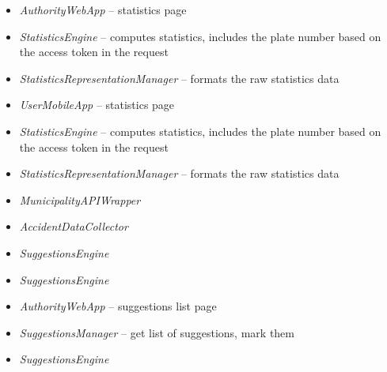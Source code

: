 \begin{description}
    \begin{itemize}
        \item \emph{AuthorityWebApp} -- statistics page
        \item \emph{StatisticsEngine} -- computes statistics, includes the plate
        number based on the access token in the request
        \item \emph{StatisticsRepresentationManager} -- formats the raw
        statistics data
    \end{itemize}

    \begin{itemize}
        \item \emph{UserMobileApp} -- statistics page
        \item \emph{StatisticsEngine} -- computes statistics, includes the plate
        number based on the access token in the request
        \item \emph{StatisticsRepresentationManager} -- formats the raw
        statistics data
    \end{itemize}

    \begin{itemize}
        \item \emph{MunicipalityAPIWrapper}
        \item \emph{AccidentDataCollector}
    \end{itemize}

    \begin{itemize}
        \item \emph{SuggestionsEngine}
    \end{itemize}

    \begin{itemize}
        \item \emph{SuggestionsEngine}
    \end{itemize}

    \begin{itemize}
        \item \emph{AuthorityWebApp} -- suggestions list page
        \item \emph{SuggestionsManager} -- get list of suggestions, mark them
    \end{itemize}

    \begin{itemize}
        \item \emph{SuggestionsEngine}
    \end{itemize}
\end{description}